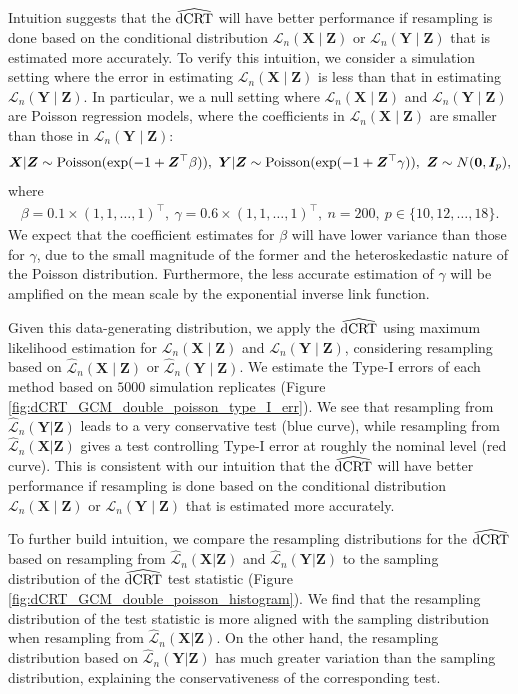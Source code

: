 \documentclass[aos]{imsart}
\theoremstyle{definition}
\theoremstyle{remark}
\newcommand{\prx}{\bm X}								%
\newcommand{\prz}{\bm Z}								%
\newcommand{\pry}{{\bm Y}}								%
\newcommand{\law}{\mathcal L}							%
\newcommand{\lawhat}{\widehat{\mathcal L}}				%
\newcommand{\dCRThat}{\widehat{\textnormal{dCRT}}}		%
\begin{document}
	Intuition suggests that the $\dCRThat$ will have better performance if resampling is done based on the conditional distribution $\law_n(\prx \mid \prz)$ or $\law_n(\pry \mid \prz)$ that is estimated more accurately. To verify this intuition, we consider a simulation setting where the error in estimating $\law_n(\prx \mid \prz)$ is less than that in estimating $\law_n(\pry \mid \prz)$. In particular, we a null setting where $\law_n(\prx \mid \prz)$ and $\law_n(\pry \mid \prz)$ are Poisson regression models, where the coefficients in $\law_n(\prx \mid \prz)$ are smaller than those in $\law_n(\pry \mid \prz)$:
	\begin{align*}
		\bm X|\bm Z\sim \textnormal{Poisson}(\exp(-1+\bm Z^\top \beta)),\ \bm Y|\bm Z\sim \textnormal{Poisson}(\exp(-1+\bm Z^\top\gamma)),\ \bm Z\sim N(\bm 0,\bm I_p),
	\end{align*}
	where 
	\begin{align*}
		\beta=0.1\times (1,1,\ldots,1)^\top,\ \gamma=0.6\times (1,1,\ldots,1)^\top, \ n = 200, \ p \in \{10, 12, \ldots, 18\}.
	\end{align*}
	We expect that the coefficient estimates for $\beta$ will have lower variance than those for $\gamma$, due to the small magnitude of the former and the heteroskedastic nature of the Poisson distribution. Furthermore, the less accurate estimation of $\gamma$ will be amplified on the mean scale by the exponential inverse link function.

	Given this data-generating distribution, we apply the $\dCRThat$ using maximum likelihood estimation for $\law_n(\prx \mid \prz)$ and $\law_n(\pry \mid \prz)$, considering resampling based on $\lawhat_n(\prx \mid \prz)$ or $\lawhat_n(\pry \mid \prz)$. We estimate the Type-I errors of each method based on $5000$ simulation replicates (Figure \ref{fig:dCRT_GCM_double_poisson_type_I_err}). We see that resampling from $\lawhat_n(\pry|\prz)$ leads to a very conservative test (blue curve), while resampling from $\lawhat_n(\prx|\prz)$ gives a test controlling Type-I error at roughly the nominal level (red curve). This is consistent with our intuition that the $\dCRThat$ will have better performance if resampling is done based on the conditional distribution $\law_n(\prx \mid \prz)$ or $\law_n(\pry \mid \prz)$ that is estimated more accurately. 

	To further build intuition, we compare the resampling distributions for the $\dCRThat$ based on resampling from $\lawhat_n(\prx|\prz)$ and $\lawhat_n(\pry|\prz)$ to the sampling distribution of the $\dCRThat$ test statistic (Figure \ref{fig:dCRT_GCM_double_poisson_histogram}). We find that the resampling distribution of the test statistic is more aligned with the sampling distribution when resampling from $\lawhat_n(\prx|\prz)$. On the other hand, the resampling distribution based on $\lawhat_n(\pry|\prz)$ has much greater variation than the sampling distribution, explaining the conservativeness of the corresponding test. 
	
\end{document}
